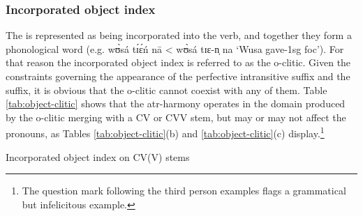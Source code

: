\begin{exe}
\begin{exe}
\begin{exe}
\begin{exe}
\begin{exe}
\begin{exe}
\begin{exe}
\begin{exe}
\begin{exe}
\begin{exe}
\begin{exe}
\begin{exe}
\subsubsection{Incorporated object index}
\label{sec:GRM-morph-opro}


The   is represented as being incorporated into the verb,  and together they form a phonological word (e.g.  {\sls wʊ̀sá tɪ́ɛ́ń nā} < {\sls wʊ̀sá tɪɛ-n̩ na}  `Wusa gave-{\sc 1sg} {\sc foc}').  For that reason the incorporated object index is referred to as the {\sc o}-clitic. Given the constraints governing the appearance of the perfective intransitive suffix and the  suffix, it is obvious that the {\sc o}-clitic cannot coexist with any of them.  Table \ref{tab:object-clitic} shows that the {\sc atr}-harmony operates in the domain produced by the {\sc o}-clitic merging with a CV or CVV stem, but may or may not affect the  pronouns, as Tables \ref{tab:object-clitic}(b) and \ref{tab:object-clitic}(c) display.\footnote{The question mark following the third person   examples flags a grammatical but infelicitous example.}

\begin{table}[!htb]
\centering
\caption{Incorporated object index on  CV(V) stems\label{tab:object-clitic}}


\end{table}
\end{exe}
\end{exe}
\end{exe}
\end{exe}
\end{exe}
\end{exe}
\end{exe}
\end{exe}
\end{exe}
\end{exe}
\end{exe}
\end{exe}
